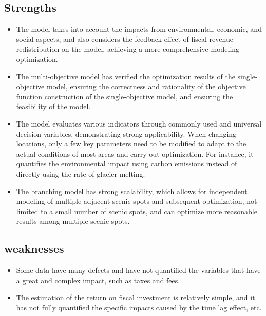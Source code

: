 \documentclass[12pt]{article}  %
\begin{document}
\subsection{Strengths}
\begin{itemize}
	\item The model takes into account the impacts from environmental, economic, and social aspects, and also considers the feedback effect of fiscal revenue redistribution on the model, achieving a more comprehensive modeling optimization. 
	\item The multi-objective model has verified the optimization results of the single-objective model, ensuring the correctness and rationality of the objective function construction of the single-objective model, and ensuring the feasibility of the model. 
	\item The model evaluates various indicators through commonly used and universal decision variables, demonstrating strong applicability. When changing locations, only a few key parameters need to be modified to adapt to the actual conditions of most areas and carry out optimization. For instance, it quantifies the environmental impact using carbon emissions instead of directly using the rate of glacier melting. 
	\item The branching model has strong scalability, which allows for independent modeling of multiple adjacent scenic spots and subsequent optimization, not limited to a small number of scenic spots, and can optimize more reasonable results among multiple scenic spots.
\end{itemize}
\subsection{weaknesses}
\begin{itemize}
	\item Some data have many defects and have not quantified the variables that have a great and complex impact, such as taxes and fees. 
	\item The estimation of the return on fiscal investment is relatively simple, and it has not fully quantified the specific impacts caused by the time lag effect, etc. 
\end{itemize}
\end{document}
